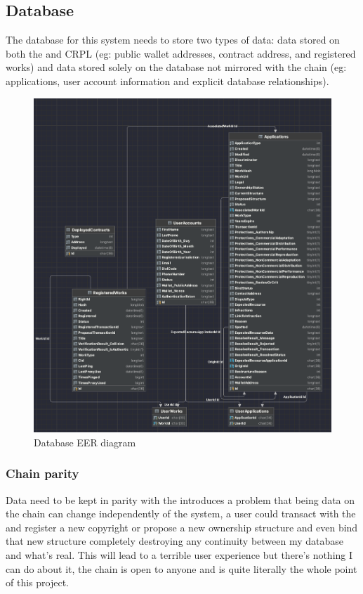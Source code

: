 \subsection{Database}

The database for this system needs to store two types of data: data stored on both the  and CRPL (eg: public wallet addresses, contract address, and registered works) and data stored solely on the database not mirrored with the chain (eg: applications, user account information and explicit database relationships).

\begin{figure}[H]
\caption{Database EER diagram}
\centering
\includegraphics[width=\textwidth,height=0.7\textheight,keepaspectratio]{images/patterns/database}
\end{figure}

\subsubsection{Chain parity}
\label{sec:chain-parity}

Data need to be kept in parity with the  introduces a problem that being data on the chain can change independently of the system, a user could transact with the   and register a new copyright or propose a new ownership structure and even bind that new structure completely destroying any continuity between my database and what's real. This will lead to a terrible user experience but there's nothing I can do about it, the chain is open to anyone and is quite literally the whole point of this project.

